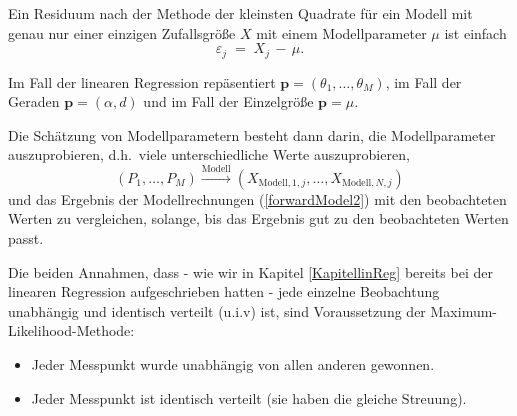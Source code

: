 Ein Residuum nach der Methode der kleinsten Quadrate für ein Modell mit genau nur einer
einzigen Zufallsgröße $X$ mit einem Modellparameter $\mu$ ist einfach
\begin{equation}
\varepsilon_j \; = \; X_j \, - \, \mu .
\label{oneQuantityOnly1}
\end{equation}

Im Fall der linearen Regression repäsentiert $\mathbf{p} = (\theta_1,\dots,\theta_M)$,
im Fall der Geraden $\mathbf{p} = (\alpha, d)$ und im Fall der Einzelgröße
$\mathbf{p} = \mu$.

Die Schätzung von Modellparametern besteht dann darin, die Modellparameter auszuprobieren,
d.h.\ viele unterschiedliche Werte \glqq auszuprobieren\grqq,
\begin{equation}
(P_1, \dots, P_M) \xrightarrow{\mathrm{Modell}} (X_{\mathrm{Modell},1,j}, \dots, X_{\mathrm{Modell},N,j})
\label{forwardModel2}
\end{equation}
 und das Ergebnis der
Modellrechnungen (\ref{forwardModel2}) mit den beobachteten Werten zu vergleichen, solange,
bis das Ergebnis \glqq gut zu den beobachteten Werten passt\grqq.



Die beiden Annahmen, dass - wie wir in Kapitel \ref{KapitellinReg} bereits bei der linearen Regression
aufgeschrieben hatten - jede einzelne Beobachtung unabhängig und identisch verteilt
(u.i.v) ist, sind Voraussetzung der Maximum-Likelihood-Methode:
\begin{itemize}
\item Jeder Messpunkt wurde unabhängig von allen anderen gewonnen.
\item Jeder Messpunkt ist identisch verteilt (sie haben die gleiche Streuung).
\end{itemize}

